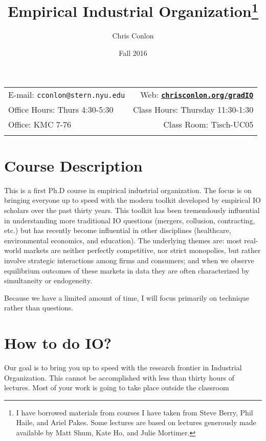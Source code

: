 \documentclass[11pt]{article}
\title{Empirical Industrial Organization\footnote{I have borrowed materials from courses I have taken from Steve Berry, Phil Haile, and Ariel Pakes. Some lectures are based on lectures generously made available by Matt Shum, Kate Ho, and Julie Mortimer.}}
\author{Chris Conlon}
\date{Fall 2016}
\newcommand{\blankline}{\quad\pagebreak[2]}
\begin{document}
\maketitle

\blankline

\begin{tabular*}{.93\textwidth}{@{\extracolsep{\fill}}lr}


  E-mail: \texttt{cconlon@stern.nyu.edu} & Web: \href{http://chrisconlon.org}{\tt\bf chrisconlon.org/gradIO}  \\

 Office Hours: Thurs 4:30-5:30  &  Class Hours: Thursday 11:30-1:30 \\


 Office: KMC 7-76  & Class Room: Tisch-UC05 \\
&  \\
\hline
\end{tabular*}

\vspace{10 mm}

\section*{Course Description}
This is a first Ph.D course in empirical industrial organization. The focus is on bringing everyone up to speed with the modern toolkit developed by empirical IO scholars over the past thirty years. This toolkit has been tremendously influential in understanding more traditional IO questions (mergers, collusion, contracting, etc.) but has recently become influential in other disciplines (healthcare, environmental economics, and education). The underlying themes are: most real-world markets are neither perfectly competitive, nor strict monopolies, but rather involve strategic interactions among firms and consumers; and when we observe equilibrium outcomes of these markets in data they are often characterized by simultaneity or endogeneity.

Because we have a limited amount of time, I will focus primarily on technique rather than questions.

\section*{How to do IO?}
Our goal is to bring you up to speed with the research frontier in Industrial Organization. This cannot be accomplished with less than thirty hours of lectures. Most of your work is going to take place outside the classroom
\end{document}
